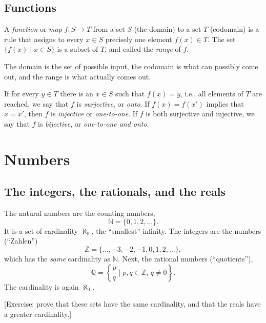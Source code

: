 \subsection{Functions}

A \emph{function} or \emph{map} $f : S \to T$ from a set $S$ (the domain) to a set $T$ (codomain) is a rule that assigns to every $x \in S$ precisely one element $f(x) \in T$. The set $\{f(x)\mid x\in S\}$ is a subset of $T$, and called the \emph{range} of $f$.

The domain is the set of possible input, the codomain is what can possibly come out, and the range is what actually comes out.

If for every $y\in T$ there is an $x\in S$ such that $f(x)=y$, i.e., all elements of $T$ are reached, we say that $f$ is \emph{surjective}, or \emph{onto}. If $f(x) = f(x')$ implies that $x = x'$, then $f$ is \emph{injective} or \emph{one-to-one}. If $f$ is both surjective and injective, we say that $f$ is \emph{bijective}, or \emph{one-to-one and onto}.


\section{Numbers}

\subsection{The integers, the rationals, and the reals}

The natural numbers are the counting numbers,
\begin{equation}
    \mathbb{N} = \{ 0, 1, 2, \ldots \}.
\end{equation}
It is a set of cardinality $\aleph_0$, the ``smallest'' infinity. The integers are the numbers (``Zahlen'')
\begin{equation}
    \mathbb{Z} = \{ \ldots, -3, -2, -1, 0, 1, 2, \ldots \},
\end{equation}
which has the \emph{same} cardinality as $\mathbb{N}$. Next,
the rational numbers (``quotients''),
\begin{equation}
    \mathbb{Q} = \left\{ \frac{p}{q} \mid p,q \in \mathbb{Z}, \, q \neq 0 \right\}.
\end{equation}
The cardinality is again $\aleph_0$.

[Exercise: prove that these sets have the same cardinality, and that the reals have a greater cardinality.]

